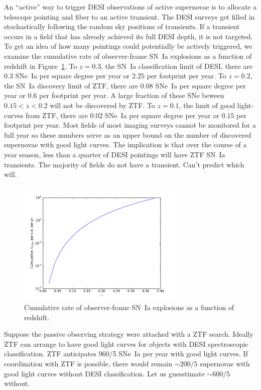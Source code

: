 \documentclass{article}   	%
\begin{document}
An ``active'' way to trigger DESI observations of active supernovae
is to allocate a telescope pointing and fiber to an active transient.
The DESI surveys get filled in stochastically following
the random sky positions of transients.    If a transient occurs in a field that
has already achieved its full DESI depth, it is not targeted.
To get an idea of how many pointings could potentially be actively triggered, we examine the cumulative rate of observer-frame SN~Ia explosions as a function of redshift in Figure~\ref{total:fig}.  To $z= 0.3$, the SN~Ia classification limit of DESI, there are $0.3$ SNe~Ia per square degree per year or $2.25$ per footprint per year.
To $z= 0.2$, the SN~Ia discovery limit of ZTF, there are $0.08$ SNe~Ia per square degree per year or $0.6$ per footprint per year.  A large fraction of these
SNe beween $0.15<z<0.2$ will not be discovered by ZTF.
To $z=0.1$, the limit of good light-curves from ZTF, there are $0.02$ SNe~Ia per square degree per year or $0.15$ per footprint per year.  
Most fields of most imaging surveys cannot be monitored for
a full year so these numbers serve as an upper bound on the number of discovered supernovae with good light curves. 
The implication is that over the course of a year season, less than a quarter of DESI pointings will have ZTF SN~Ia transients.
The majority of fields do not have a transient. Can't predict which will.

\begin{figure}[h]
\includegraphics[width=8cm]{../src/total.pdf}
\centering
\caption{Cumulative rate of observer-frame SN~Ia explosions as a function of redshift. \label{total:fig}}
\end{figure}



Suppose the passive observing strategy were attached with a ZTF search. Ideally ZTF can arrange to have good light curves
for objects with DESI spectroscopic
classification.  ZTF anticipates 960/5 SNe~Ia per year with good light curves.
If coordination with ZTF is possible, there would remain $\sim 200/5$ supernovae with good light curves without DESI classification. 
Let us guesstimate $\sim 600/5$ without.  
\end{document}
